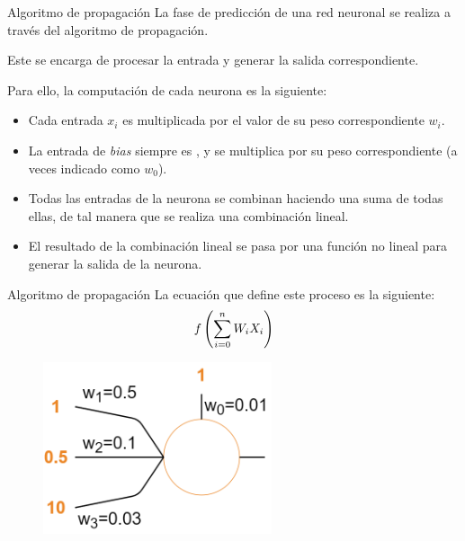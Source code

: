 \begin{frame}{Algoritmo de propagación}
La fase de \alert{predicción} de una red neuronal se realiza a través del algoritmo de \alert{propagación}.

Este se encarga de procesar la \alert{entrada} y generar la \alert{salida} correspondiente.

Para ello, la computación de cada \alert{neurona} es la siguiente:
\begin{itemize}
    \item Cada entrada $x_{i}$ es \alert{multiplicada} por el valor de su peso correspondiente $w_{i}$.
    \item La entrada de \textit{bias} \alert{siempre} es , y se multiplica por su peso correspondiente (a veces indicado como $w_{0}$).
    \item Todas las \alert{entradas} de la neurona se combinan haciendo una \alert{suma} de todas ellas, de tal manera que se realiza una \alert{combinación lineal}.
    \item El resultado de la combinación lineal se pasa por una \alert{función no lineal} para generar la \alert{salida} de la neurona.
\end{itemize}
\end{frame}

\begin{frame}{Algoritmo de propagación}
La ecuación que define este \alert{proceso} es la siguiente:
\setcounter{equation}{0}
\begin{equation}
    \Large f\left(\sum_{i=0}^{n} W_{i} X_{i}\right)
\end{equation}

\begin{figure}
\centering
    \includegraphics[width=0.6\textwidth]{Slides/figures/Tema 3/PropagationExample_1.png}
\end{figure}
\end{frame}

